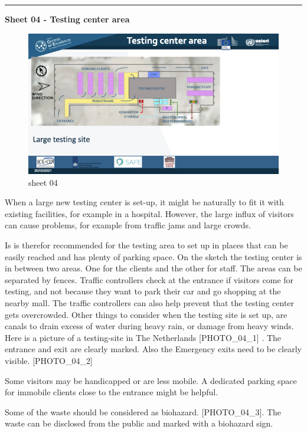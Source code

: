 \documentclass[
]{book}
\begin{document}
\begin{center}\rule{0.5\linewidth}{0.5pt}\end{center}

\textbf{Sheet 04 - Testing center area}

\begin{figure}
\centering
\includegraphics{images/m05/m05_Workflow_final.004.jpeg}
\caption{sheet 04}
\end{figure}

When a large new testing center is set-up, it might be naturally to fit
it with existing facilities, for example in a hospital. However, the
large influx of visitors can cause problems, for example from traffic
jams and large crowds.

Is is therefor recommended for the testing area to set up in places that
can be easily reached and has plenty of parking space. On the sketch the
testing center is in between two areas. One for the clients and the
other for staff. The areas can be separated by fences. Traffic
controllers check at the entrance if visitors come for testing, and not
because they want to park their car and go shopping at the nearby mall.
The traffic controllers can also help prevent that the testing center
gets overcrowded. Other things to consider when the testing site is set
up, are canals to drain excess of water during heavy rain, or damage
from heavy winds. Here is a picture of a testing-site in The Netherlands
{[}PHOTO\_04\_1{]} . The entrance and exit are clearly marked. Also the
Emergency exits need to be clearly visible. {[}PHOTO\_04\_2{]}

Some visitors may be handicapped or are less mobile. A dedicated parking
space for immobile clients close to the entrance might be helpful.

Some of the waste should be considered as biohazard. {[}PHOTO\_04\_3{]}. The
waste can be disclosed from the public and marked with a biohazard sign.
\end{document}
